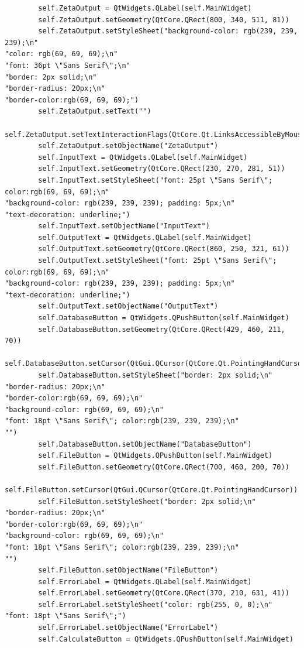 \documentclass[12pt]{article}
\begin{document}
\begin{lstlisting}
        self.ZetaOutput = QtWidgets.QLabel(self.MainWidget)
        self.ZetaOutput.setGeometry(QtCore.QRect(800, 340, 511, 81))
        self.ZetaOutput.setStyleSheet("background-color: rgb(239, 239, 239);\n"
"color: rgb(69, 69, 69);\n"
"font: 36pt \"Sans Serif\";\n"
"border: 2px solid;\n"
"border-radius: 20px;\n"
"border-color:rgb(69, 69, 69);")
        self.ZetaOutput.setText("")
        self.ZetaOutput.setTextInteractionFlags(QtCore.Qt.LinksAccessibleByMouse|QtCore.Qt.TextSelectableByKeyboard|QtCore.Qt.TextSelectableByMouse)
        self.ZetaOutput.setObjectName("ZetaOutput")
        self.InputText = QtWidgets.QLabel(self.MainWidget)
        self.InputText.setGeometry(QtCore.QRect(230, 270, 281, 51))
        self.InputText.setStyleSheet("font: 25pt \"Sans Serif\"; color:rgb(69, 69, 69);\n"
"background-color: rgb(239, 239, 239); padding: 5px;\n"
"text-decoration: underline;")
        self.InputText.setObjectName("InputText")
        self.OutputText = QtWidgets.QLabel(self.MainWidget)
        self.OutputText.setGeometry(QtCore.QRect(860, 250, 321, 61))
        self.OutputText.setStyleSheet("font: 25pt \"Sans Serif\"; color:rgb(69, 69, 69);\n"
"background-color: rgb(239, 239, 239); padding: 5px;\n"
"text-decoration: underline;")
        self.OutputText.setObjectName("OutputText")
        self.DatabaseButton = QtWidgets.QPushButton(self.MainWidget)
        self.DatabaseButton.setGeometry(QtCore.QRect(429, 460, 211, 70))
        self.DatabaseButton.setCursor(QtGui.QCursor(QtCore.Qt.PointingHandCursor))
        self.DatabaseButton.setStyleSheet("border: 2px solid;\n"
"border-radius: 20px;\n"
"border-color:rgb(69, 69, 69);\n"
"background-color: rgb(69, 69, 69);\n"
"font: 18pt \"Sans Serif\"; color:rgb(239, 239, 239);\n"
"")
        self.DatabaseButton.setObjectName("DatabaseButton")
        self.FileButton = QtWidgets.QPushButton(self.MainWidget)
        self.FileButton.setGeometry(QtCore.QRect(700, 460, 200, 70))
        self.FileButton.setCursor(QtGui.QCursor(QtCore.Qt.PointingHandCursor))
        self.FileButton.setStyleSheet("border: 2px solid;\n"
"border-radius: 20px;\n"
"border-color:rgb(69, 69, 69);\n"
"background-color: rgb(69, 69, 69);\n"
"font: 18pt \"Sans Serif\"; color:rgb(239, 239, 239);\n"
"")
        self.FileButton.setObjectName("FileButton")
        self.ErrorLabel = QtWidgets.QLabel(self.MainWidget)
        self.ErrorLabel.setGeometry(QtCore.QRect(370, 210, 631, 41))
        self.ErrorLabel.setStyleSheet("color: rgb(255, 0, 0);\n"
"font: 18pt \"Sans Serif\";")
        self.ErrorLabel.setObjectName("ErrorLabel")
        self.CalculateButton = QtWidgets.QPushButton(self.MainWidget)

\end{lstlisting}
\end{document}
